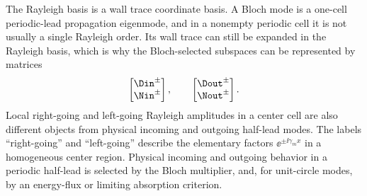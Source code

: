 The Rayleigh basis is a wall trace coordinate basis.  A Bloch mode is a one-cell
periodic-lead propagation eigenmode, and in a nonempty periodic cell it is not
usually a single Rayleigh order.  Its wall trace can still be expanded in the
Rayleigh basis, which is why the Bloch-selected subspaces can be represented by
matrices
\[
  \begin{bmatrix}
  \Din^\pm\\
  \Nin^\pm
  \end{bmatrix},
  \qquad
  \begin{bmatrix}
  \Dout^\pm\\
  \Nout^\pm
  \end{bmatrix}.
\]
Local right-going and left-going Rayleigh amplitudes in a center cell are also
different objects from physical incoming and outgoing half-lead modes.  The
labels ``right-going'' and ``left-going'' describe the elementary factors
\(\ee^{\pm \ii\gamma_m x}\) in a homogeneous center region.  Physical incoming
and outgoing behavior in a periodic half-lead is selected by the Bloch
multiplier, and, for unit-circle modes, by an energy-flux or limiting absorption
criterion.
